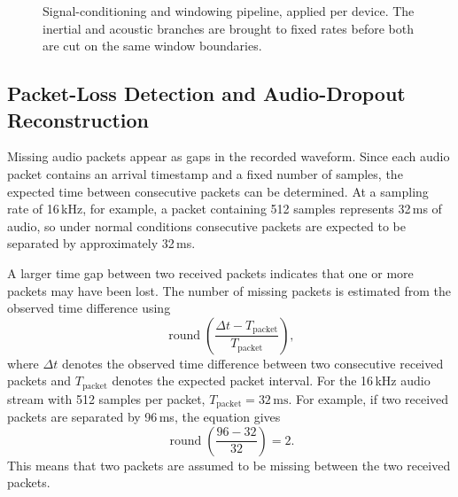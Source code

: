 \begin{figure}[htbp]
\centering
{}
\caption{Signal-conditioning and windowing pipeline, applied per device. The
inertial and acoustic branches are brought to fixed rates before both are cut on
the same window boundaries.}
\label{fig:pipeline}
\end{figure}

\subsection{Packet-Loss Detection and Audio-Dropout Reconstruction}
\label{sec:dropout}

Missing audio packets appear as gaps in the recorded waveform. Since each audio
packet contains an arrival timestamp and a fixed number of samples, the
expected time between consecutive packets can be determined. At a sampling rate
of 16\,kHz, for example, a packet containing 512 samples represents 32\,ms of
audio, so under normal conditions consecutive packets are expected to be
separated by approximately 32\,ms.

A larger time gap between two received packets indicates that one or more
packets may have been lost. The number of missing packets is estimated from the
observed time difference using
\[
\operatorname{round}\!\left(\frac{\Delta t - T_{\mathrm{packet}}}{T_{\mathrm{packet}}}\right),
\]
where $\Delta t$ denotes the observed time difference between two consecutive
received packets and $T_{\mathrm{packet}}$ denotes the expected packet
interval. For the 16\,kHz audio stream with 512 samples per packet,
$T_{\mathrm{packet}} = 32\,\mathrm{ms}$. For example, if two received packets
are separated by 96\,ms, the equation gives
\[
\operatorname{round}\!\left(\frac{96 - 32}{32}\right) = 2.
\]
This means that two packets are assumed to be missing between the two received
packets.

